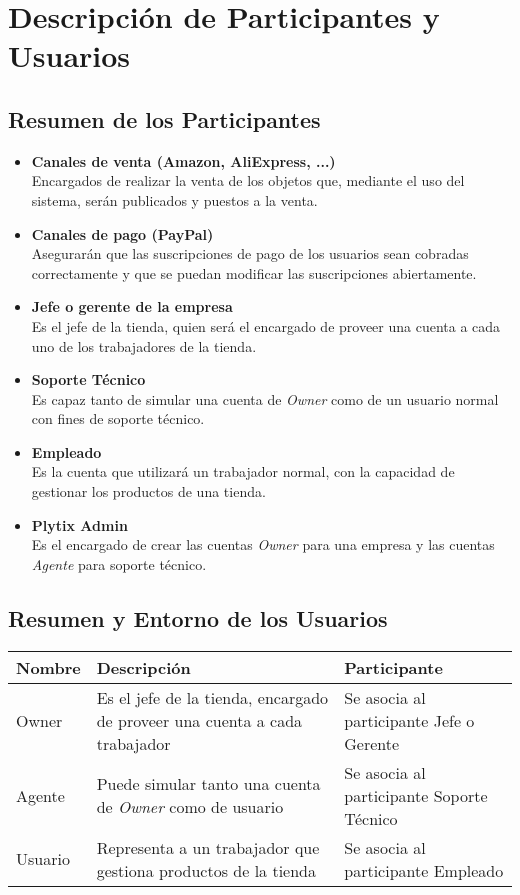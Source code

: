 \documentclass{article}
\begin{document}
\section{Descripción de Participantes y Usuarios}

\subsection{Resumen de los Participantes}

\begin{itemize}

    \item \textbf{Canales de venta (Amazon, AliExpress, ...)} \\
        Encargados de realizar la venta de los objetos que, mediante el uso del sistema, serán publicados y puestos a la venta.
    \item \textbf{Canales de pago (PayPal)} \\
        Asegurarán que las suscripciones de pago de los usuarios sean cobradas correctamente y que se puedan modificar las suscripciones abiertamente.
    \item \textbf{Jefe o gerente de la empresa} \\
        Es el jefe de la tienda, quien será el encargado de proveer una cuenta a cada uno de los trabajadores de la tienda.
    \item \textbf{Soporte Técnico} \\
        Es capaz tanto de simular una cuenta de \textit{Owner} como de un usuario normal con fines de soporte técnico.
    \item \textbf{Empleado} \\
        Es la cuenta que utilizará un trabajador normal, con la capacidad de gestionar los productos de una tienda.
    \item \textbf{Plytix Admin} \\
        Es el encargado de crear las cuentas \textit{Owner} para una empresa y las cuentas \textit{Agente} para soporte técnico.
\end{itemize}

\subsection{Resumen y Entorno de los Usuarios}

\begin{tabularx}{\textwidth}{|l|X|l|}
    \hline
    \textbf{Nombre} & \textbf{Descripción} & \textbf{Participante} \\
    \hline
    Owner & Es el jefe de la tienda, encargado de proveer una cuenta a cada trabajador & Se asocia al participante Jefe o Gerente \\
    \hline
    Agente & Puede simular tanto una cuenta de \textit{Owner} como de usuario & Se asocia al participante Soporte Técnico \\
    \hline
    Usuario & Representa a un trabajador que gestiona productos de la tienda & Se asocia al participante Empleado \\
    \hline
\end{tabularx}
\end{document}
